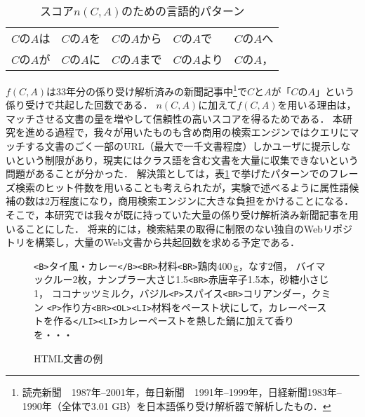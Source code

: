 \begin{table}[b]
  \caption{スコア$n(C,A)$のための言語的パターン}
  \label{table:pattern}
  \begin{center}
    \begin{tabular}{|lllll|}
      \hline
      $C$の$A$は & $C$の$A$を & $C$の$A$から & $C$の$A$で & $C$の$A$へ\\
      $C$の$A$が & $C$の$A$に & $C$の$A$まで & $C$の$A$より & $C$の$A$，\\
      \hline
    \end{tabular}
  \end{center}
\end{table}

$f(C,A)$は33年分の係り受け解析済みの新聞記事中\footnote{読売新聞　1987年--2001年，毎日新聞　1991年--1999年，日経新聞1983年--1990年（全体で3.01 GB）を日本語係り受け解析器\cite{Kanayama_2000}で解析したもの．}で$C$と$A$が「$C$の$A$」という係り受けで共起した回数である．
$n(C,A)$に加えて$f(C,A)$を用いる理由は，マッチさせる文書の量を増やして信頼性の高いスコアを得るためである．
本研究を進める過程で，我々が用いたものも含め商用の検索エンジンではクエリにマッチする文書のごく一部のURL（最大で一千文書程度）しかユーザに提示しないという制限があり，現実にはクラス語を含む文書を大量に収集できないという問題があることが分かった．
解決策としては，表\ref{table:pattern}\,で挙げたパターンでのフレーズ検索のヒット件数を用いることも考えられたが，実験で述べるように属性語候補の数は2万程度になり，商用検索エンジンに大きな負担をかけることになる．
そこで，本研究では我々が既に持っていた大量の係り受け解析済み新聞記事を用いることにした．
将来的には，検索結果の取得に制限のない独自のWebリポジトリを構築し，大量のWeb文書から共起回数を求める予定である．

\begin{figure}[t]
\vbox{
\verb!<B>!タイ風・カレー\verb!</B><BR>!材料\verb!<BR>!鶏肉400\,g，なす2個，
バイマックルー2枚，ナンプラー大さじ1.5\verb!<BR>!赤唐辛子1.5本，砂糖小さじ1，
ココナッツミルク，バジル\verb!<P>!スパイス\verb!<BR>!コリアンダー，クミン
\verb!<P>!作り方\verb!<BR><OL><LI>!材料をペースト状にして，カレーペーストを作る\verb!</LI><LI>!カレーペーストを熱した鍋に加えて香りを・・・
}
\begin{center}
\end{center}
\caption{HTML文書の例}
\label{fig:html}
\end{figure}

